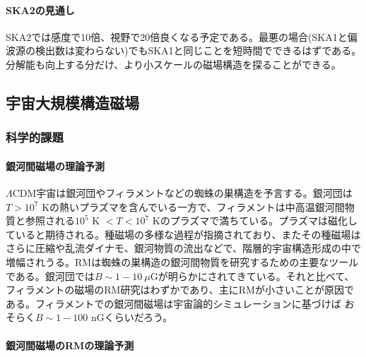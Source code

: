 \paragraph{SKA2の見通し}

SKA2では感度で10倍、視野で20倍良くなる予定である。最悪の場合(SKA1と偏波源の検出数は変わらない)でもSKA1と同じことを短時間でできるはずである。分解能も向上する分だけ、より小スケールの磁場構造を探ることができる。


\subsection{宇宙大規模構造磁場}
\label{c06.s2.ss6}

\subsubsection{科学的課題}
\label{c06.s2.ss6.sss1}

\paragraph{銀河間磁場の理論予測}

 $\Lambda$CDM宇宙は銀河団やフィラメントなどの蜘蛛の巣構造を予言する。銀河団は $T > 10^7$ Kの熱いプラズマを含んでいる一方で、フィラメントは中高温銀河間物質と参照される$10^5$ K $< T < 10^7$ Kのプラズマで満ちている。プラズマは磁化していると期待される。種磁場の多様な過程が指摘されており、またその種磁場はさらに圧縮や乱流ダイナモ、銀河物質の流出などで、階層的宇宙構造形成の中で増幅されうる\citep{2012SSRv..166....1R,2012SSRv..166...37W}。RMは蜘蛛の巣構造の銀河間物質を研究するための主要なツールである。銀河団では$B \sim 1 - 10\ \mu$Gが明らかにされてきている。それと比べて、フィラメントの磁場のRM研究はわずかであり、主にRMが小さいことが原因である。フィラメントでの銀河間磁場は宇宙論的シミュレーションに基づけば \citep{2008Sci...320..909R}おそらく$B \sim 1-100$ nGくらいだろう。

\paragraph{銀河間磁場のRMの理論予測}


